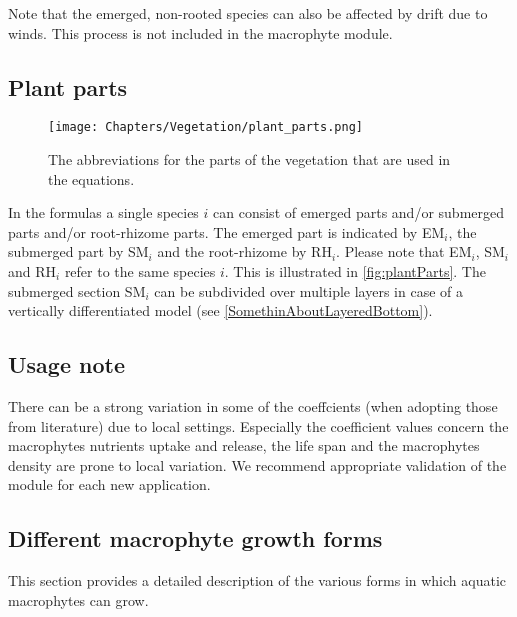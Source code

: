 Note that the emerged, non-rooted species can also be affected by drift due to winds. This process is not included
in the macrophyte module.

\subsection{Plant parts}

\begin{figure}
\begin{center}
\texttt{[image: Chapters/Vegetation/plant\_parts.png]}
\caption{The abbreviations for the parts of the vegetation that are used in the equations.}
\label{fig:plantParts}
\end{center}
\end{figure}

In the formulas a single species $i$ can consist of emerged parts and/or submerged parts and/or root-rhizome
parts. The emerged part is indicated by EM$_i$, the submerged part by SM$_i$ and the root-rhizome by RH$_i$. Please note
that EM$_i$, SM$_i$ and RH$_i$ refer to the same species $i$. This is illustrated in \autoref{fig:plantParts}.
The submerged section SM$_i$ can be subdivided over multiple layers in case of a vertically differentiated model
(see \autoref{SomethinAboutLayeredBottom}).

\subsection{Usage note}
There can be a strong variation in some of the coeffcients (when adopting those from literature) due to local
settings. Especially the coefficient values concern the macrophytes nutrients uptake and release, the life
span and the macrophytes density are prone to local variation. We recommend appropriate validation of the
module for each new application.

\subsection{Different macrophyte growth forms}
This section provides a detailed description of the various forms in which aquatic macrophytes can grow.

